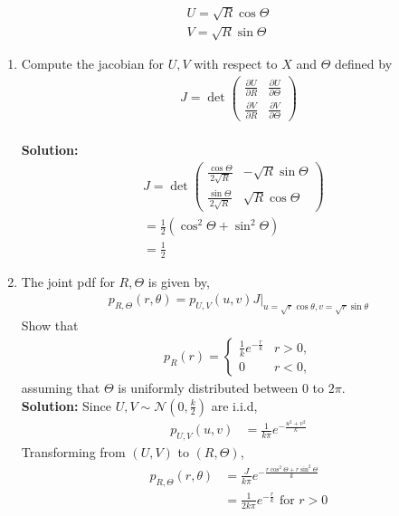 \documentclass[journal,10pt,twocolumn]{IEEEtran}
\providecommand{\brak}[1]{\ensuremath{\left(#1\right)}}
\newcommand{\solution}{\noindent \textbf{Solution: }}
\begin{document}
\begin{enumerate}
%
\begin{align}
U = \sqrt{R} \cos \Theta \\
V = \sqrt{R} \sin \Theta
\end{align}
\begin{enumerate}[label=(\alph{enumii})]
\item 
Compute the jacobian for $U,V$ with respect to $X$ and $\Theta$ defined by
%
\begin{align}
J = \det\brak{
\begin{matrix}
\frac{\partial U}{\partial R} & \frac{\partial U}{\partial \Theta} \\
\frac{\partial V}{\partial R} & \frac{\partial V}{\partial \Theta}
\end{matrix}
}
\end{align}\\
\solution 
\begin{align}
J = \det\brak{
\begin{matrix}
\frac{\cos \Theta}{2\sqrt{R}} & -\sqrt{R}\sin \Theta \\
\frac{\sin \Theta}{2\sqrt{R}} & \sqrt{R}\cos \Theta
\end{matrix}
}\\
= \frac{1}{2}\brak{\cos^2\Theta + \sin^2\Theta}&\\
= \frac{1}{2}&
\end{align}
\item 
The joint pdf for $R,\Theta$ is given by,
%
\begin{align}
p_{R,\Theta}\brak{r,\theta} = p_{U,V}\brak{u,v}J\vert_{u = \sqrt{r}\cos\theta,v = \sqrt{r}\sin\theta}
\end{align}
Show that
%
\begin{align}
p_{R}(r) = 
\begin{cases}
\frac{1}{k}e^{-\frac{r}{k}} & r > 0, \\
0 & r < 0,
\end{cases}
\end{align}
%
assuming that $\Theta$ is uniformly distributed between 0 to $2\pi$.\\
\solution Since $U,V\sim\mathcal{N}\brak{0,\frac{k}{2}}$ are i.i.d,
\begin{align}
	p_{U,V}\brak{u,v} &= \frac{1}{k\pi}e^{-\frac{u^2+v^2}{k}}
\end{align}
Transforming from $(U,V)$ to $(R,\Theta)$,
\begin{align}
	p_{R,\Theta}\brak{r,\theta} &= \frac{J}{k\pi}e^{-\frac{r\cos^2\Theta+r\sin^2\Theta}{k}}\\
	&= \frac{1}{2k\pi}e^{-\frac{r}{k}} \text{ for $r > 0$}

\end{align}
\end{enumerate}
\end{enumerate}
\end{document}
